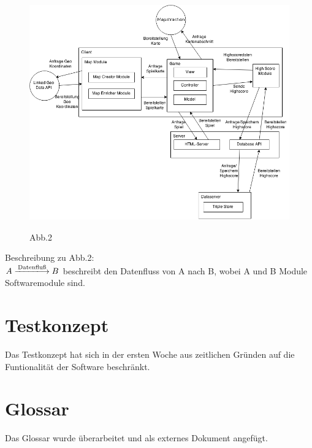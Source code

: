 \documentclass[11pt,a4paper]{article}
\begin{document}
\begin{figure}[htb]
  \centering
  \includegraphics[scale=0.5]{Architecture.png}
  \label{PNFs}
  \caption{Abb.2}
\end{figure} 

Beschreibung zu Abb.2: \\
$A \xlongrightarrow{\text{Datenfluß}} B $ beschreibt den Datenfluss von A nach B, wobei A und B Module Softwaremodule sind.


\section{Testkonzept}
Das Testkonzept hat sich in der ersten Woche aus zeitlichen Gründen auf die Funtionalität der Software beschränkt. 

\section{Glossar}
Das Glossar wurde überarbeitet und als externes Dokument angefügt.
\end{document}
